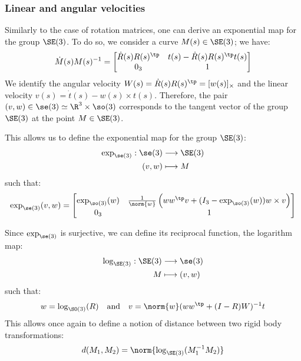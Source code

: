 \subsubsection{Linear and angular velocities}
Similarly to the case of rotation matrices, one can derive an exponential map for the group $\SE(3)$. To do so, we consider a curve $M(s)\in\SE(3)$; we have:
\begin{equation*}
    \dot{M}(s)M(s)^{-1} = \begin{bmatrix}
        \dot{R}(s)R(s)^\tp & t(s) - \dot{R}(s)R(s)^\tp t(s) \\
        0_3 & 1
    \end{bmatrix}
\end{equation*}
We identify the angular velocity $W(s)=\dot{R}(s)R(s)^\tp=[w(s)]_\times$ and the linear velocity $v(s)=\dot{t}(s)-w(s)\times t(s)$. Therefore, the pair $(v, w)\in\se(3)\simeq\R^3 \times \so(3)$ corresponds to the tangent vector of the group $\SE(3)$ at the point $M\in\SE(3)$.

This allows us to define the exponential map for the group $\SE(3)$:
\begin{equation*}
    \begin{aligned}
        \exp_{\se(3)}:\se(3)&\longrightarrow\SE(3)\\
        (v, w) &\longmapsto M
    \end{aligned}
\end{equation*}
such that:
\begin{equation*}
    \exp_{\se(3)}(v, w) = \begin{bmatrix}
        \exp_{\so(3)}(w) & \frac{1}{\norm{w}}\left(ww^\tp v + (I_3 - \exp_{\so(3)}(w))w\times v\right) \\
        0_3 & 1
    \end{bmatrix}
\end{equation*}

Since $\exp_{\se(3)}$ is surjective, we can define its reciprocal function, the logarithm map:
\begin{equation*}
    \begin{aligned}
        \log_{\SE(3)}:\SE(3)&\longrightarrow\se(3)\\
        M &\longmapsto (v, w)
    \end{aligned}
\end{equation*}
such that:
\begin{equation*}
    w = \log_{\SO(3)}(R) \quad\text{and}\quad
    v = \norm{w}(ww^\tp+(I-R)W)^{-1}t
\end{equation*}
This allows once again to define a notion of distance between two rigid body transformations:
\begin{equation*}
    d(M_1, M_2) = \norm{\log_{\SE(3)}(M_1^{-1}M_2)}
\end{equation*}